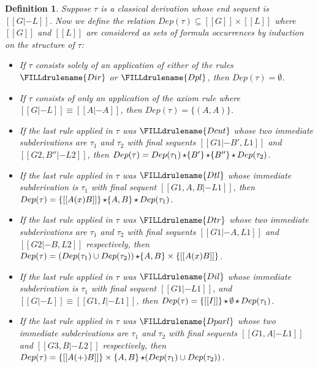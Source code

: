 \documentclass{article}
\newtheorem{definition}[theorem]{Definition}
\begin{document}
\begin{definition}
  \label{def:dep-dep-rel}
  Suppose $\tau$ is a classical derivation whose end sequent is $[[G
  |- L]]$.  Now we define the relation $Dep(\tau) \subseteq [[G]]
  \times [[L]]$ where $[[G]]$ and $[[L]]$ are considered as sets of
  formula occurrences by induction on the structure of $\tau$:
  \begin{itemize}
  \item[Case.] If $\tau$ consists solely of an application of either of the rules
    $\FILLdrulename{Dir}$ or $\FILLdrulename{Dpl}$, then $Dep(\tau) =
    \emptyset$.  

  \item[Case.] If $\tau$ consists of only an application of the axiom
    rule where $[[G |- L]] \equiv [[A |- A]]$, then $Dep(\tau) =
    \{(A,A)\}$.

    
  \item[Case.] If the last rule applied in $\tau$ was
    $\FILLdrulename{Dcut}$ whose two immediate subderivations are
    $\tau_1$ and $\tau_2$ with final sequents $[[G1 |- B', L1]]$ and
    $[[G2, B'' |- L2]]$, then $Dep(\tau) = Dep(\tau_1) \mathop{\star} \{B'\}
    \mathop{\star} \{B''\} \mathop{\star} Dep(\tau_2)$.

  \item[Case.] If the last rule applied in $\tau$ was
    $\FILLdrulename{Dtl}$ whose immediate subderivation is
    $\tau_1$ with final sequent $[[G1,A,B |- L1]]$, 
    then 
    $Dep(\tau) = \{[[A (x) B]]\} \mathop{\star} \{A,B\} \mathop{\star} Dep(\tau_1)$.

  \item[Case.] If the last rule applied in $\tau$ was
    $\FILLdrulename{Dtr}$ whose two immediate subderivations are
    $\tau_1$ and $\tau_2$ with final sequents $[[G1 |- A,L1]]$ and
    $[[G2 |- B,L2]]$ respectively, then 
    $Dep(\tau) = (Dep(\tau_1) \cup Dep(\tau_2)) \mathop{\star} \{A,B\} \times
    \{[[A (x) B]]\}$.

  \item[Case.] If the last rule applied in $\tau$ was
    $\FILLdrulename{Dil}$ whose immediate subderivation is
    $\tau_1$ with final sequent $[[G1 |- L1]]$, and $[[G |- L]] \equiv
    [[G1,I |- L1]]$, 
    then 
    $Dep(\tau) = \{[[I]]\} \mathop{\star} \emptyset \mathop{\star} Dep(\tau_1)$.

  \item[Case.] If the last rule applied in $\tau$ was
    $\FILLdrulename{Dparl}$ whose two immediate subderivations are
    $\tau_1$ and $\tau_2$ with final sequents $[[G1, A |- L1]]$ and
    $[[G3, B |- L2]]$ respectively, then 
    $Dep(\tau) = \{[[A (+) B]]\} \times \{A,B\} \mathop{\star} (Dep(\tau_1) \cup
    Dep(\tau_2))$.


\end{itemize}
\end{definition}
\end{document}
